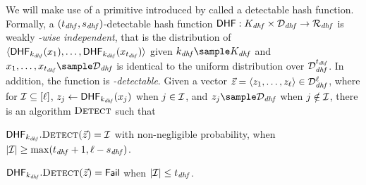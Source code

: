 %
We will make use of a primitive introduced by \citet{bhowmick2021apple} called a detectable hash 
function. Formally, a $(t_{\mathit{dhf}}, s_{\mathit{dhf}})$-detectable 
hash function $\dhf: \dhfKeySpace \times \dhfDomain \rightarrow \dhfRange$ is weakly \textit{\dhfParamMatchThreshold-wise
  independent}, that is the distribution of
  $\langle\dhf[\dhfKey](\genericFnInput[1]), \dots,
  \dhf[\dhfKey](\genericFnInput[\dhfParamMatchThreshold])\rangle$
  given $\dhfKey \getsr \dhfKeySpace$ and $\genericFnInput[1], \dots,
  \genericFnInput[\dhfParamMatchThreshold] \getsr \dhfDomain$ is
  identical to the uniform distribution over
  $\mathcal{D}_{\mathit{dhf}}^{t_{\mathit{dhf}}}$. In addition, the function is \textit{\dhfParamRandThreshold-detectable}. 
  Given a vector $\genericVec = \tupleDefn{\genericVec[1], \dots, 
    \genericVec[\genericVecLen]} \in \dhfDomain^{\genericVecLen}$, where for $\matchedIndexSet 
  \subseteq \nats[\genericVecLen]$, $\genericVec[\projIdx] \gets 
  \dhf[\dhfKey](\genericFnInput[\projIdx])$ when $\projIdx \in \matchedIndexSet$, 
  and $\genericVec[\projIdx] \getsr \dhfDomain$ when $\projIdx \notin \matchedIndexSet$, 
  there is an algorithm $\textsc{Detect}$ such that 

	\itemListStart
  \item $\dhf[\dhfKey].\dhfDetect(\genericVec) =
    \matchedIndexSet$ with non-negligible probability,
    when $\setSize{\matchedIndexSet} \ge
    \max(\dhfParamMatchThreshold+1, \genericVecLen -
    \dhfParamRandThreshold)$.
  \item $\dhf[\dhfKey].\dhfDetect(\genericVec) =
    \dhfFail$ when $\setSize{\matchedIndexSet} \le
    \dhfParamMatchThreshold$.
\itemListEnd
\fi 

